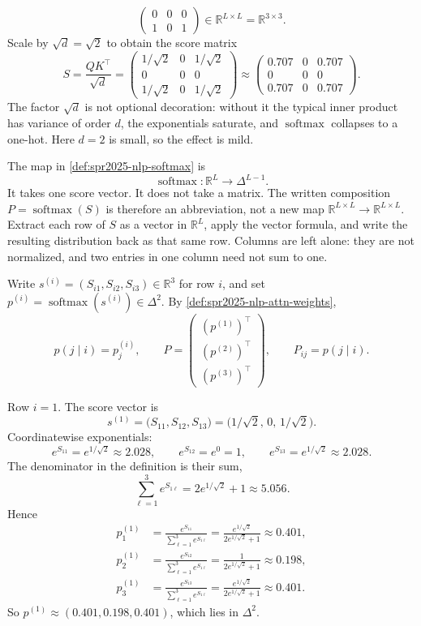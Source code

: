 \documentclass[11pt,a4paper]{article}
\DeclareMathOperator{\softmax}{softmax}
\theoremstyle{definition}
\begin{document}
\begin{example}
\[\begin{pmatrix}
0&0&0\\
1&0&1
\end{pmatrix}
\in\mathbb{R}^{L\times L}=\mathbb{R}^{3\times 3}.
\]
Scale by \(\sqrt{d}=\sqrt{2}\) to obtain the score matrix
\[
S=\frac{QK^\top}{\sqrt{d}}
=\begin{pmatrix}
1/\sqrt{2}&0&1/\sqrt{2}\\
0&0&0\\
1/\sqrt{2}&0&1/\sqrt{2}
\end{pmatrix}
\approx
\begin{pmatrix}
0.707&0&0.707\\
0&0&0\\
0.707&0&0.707
\end{pmatrix}.
\]
The factor \(\sqrt{d}\) is not optional decoration: without it the typical inner product has variance of order \(d\), the exponentials saturate, and \(\softmax\) collapses to a one-hot. Here \(d=2\) is small, so the effect is mild.

The map in \cref{def:spr2025-nlp-softmax} is
\[
\softmax:\mathbb{R}^{L}\to\Delta^{L-1}.
\]
It takes one score vector. It does not take a matrix. The written composition \(P=\softmax(S)\) is therefore an abbreviation, not a new map \(\mathbb{R}^{L\times L}\to\mathbb{R}^{L\times L}\). Extract each row of \(S\) as a vector in \(\mathbb{R}^{L}\), apply the vector formula, and write the resulting distribution back as that same row. Columns are left alone: they are not normalized, and two entries in one column need not sum to one.

Write \(s^{(i)}=(S_{i1},S_{i2},S_{i3})\in\mathbb{R}^{3}\) for row \(i\), and set \(p^{(i)}=\softmax(s^{(i)})\in\Delta^{2}\). By \cref{def:spr2025-nlp-attn-weights},
\[
p(j\mid i)=p^{(i)}_{j},\qquad
P
=\begin{pmatrix}
(p^{(1)})^\top\\
(p^{(2)})^\top\\
(p^{(3)})^\top
\end{pmatrix},
\qquad
P_{ij}=p(j\mid i).
\]

Row \(i=1\). The score vector is
\[
s^{(1)}
=\bigl(S_{11},S_{12},S_{13}\bigr)
=\bigl(1/\sqrt{2},\,0,\,1/\sqrt{2}\bigr).
\]
Coordinatewise exponentials:
\[
e^{S_{11}}=e^{1/\sqrt{2}}\approx 2.028,\qquad
e^{S_{12}}=e^{0}=1,\qquad
e^{S_{13}}=e^{1/\sqrt{2}}\approx 2.028.
\]
The denominator in the definition is their sum,
\[
\sum_{\ell=1}^{3}e^{S_{1\ell}}
=2e^{1/\sqrt{2}}+1
\approx 5.056.
\]
Hence
\begin{align*}
p^{(1)}_{1}
&=\frac{e^{S_{11}}}{\sum_{\ell=1}^{3}e^{S_{1\ell}}}
=\frac{e^{1/\sqrt{2}}}{2e^{1/\sqrt{2}}+1}
\approx 0.401,\\
p^{(1)}_{2}
&=\frac{e^{S_{12}}}{\sum_{\ell=1}^{3}e^{S_{1\ell}}}
=\frac{1}{2e^{1/\sqrt{2}}+1}
\approx 0.198,\\
p^{(1)}_{3}
&=\frac{e^{S_{13}}}{\sum_{\ell=1}^{3}e^{S_{1\ell}}}
=\frac{e^{1/\sqrt{2}}}{2e^{1/\sqrt{2}}+1}
\approx 0.401.
\end{align*}
So \(p^{(1)}\approx(0.401,0.198,0.401)\), which lies in \(\Delta^{2}\).


\end{example}
\end{document}

